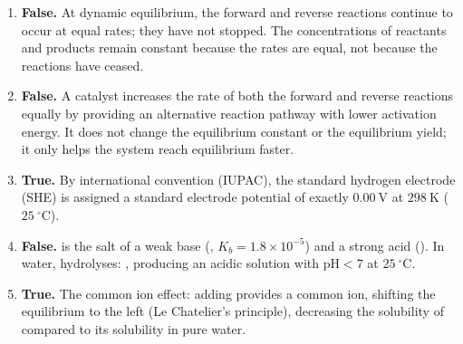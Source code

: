 \documentclass[11pt]{article}
\begin{document}
\begin{corrige}
\begin{enumerate}
\item \textbf{False.} At dynamic equilibrium, the forward and reverse reactions continue to occur at equal rates; they have not stopped. The concentrations of reactants and products remain constant because the rates are equal, not because the reactions have ceased.
\item \textbf{False.} A catalyst increases the rate of both the forward and reverse reactions equally by providing an alternative reaction pathway with lower activation energy. It does not change the equilibrium constant or the equilibrium yield; it only helps the system reach equilibrium faster.
\item \textbf{True.} By international convention (IUPAC), the standard hydrogen electrode (SHE)  is assigned a standard electrode potential of exactly $0.00\ \mathrm{V}$ at $298\ \mathrm{K}$ ($25\ ^\circ\mathrm{C}$).
\item \textbf{False.}  is the salt of a weak base (, $K_b = 1.8\times 10^{-5}$) and a strong acid (). In water,  hydrolyses: , producing an acidic solution with $\mathrm{pH} < 7$ at $25\ ^\circ\mathrm{C}$.
\item \textbf{True.} The common ion effect: adding  provides a common  ion, shifting the equilibrium  to the left (Le Chatelier's principle), decreasing the solubility of  compared to its solubility in pure water.
\end{enumerate}
\end{corrige}
\end{document}
